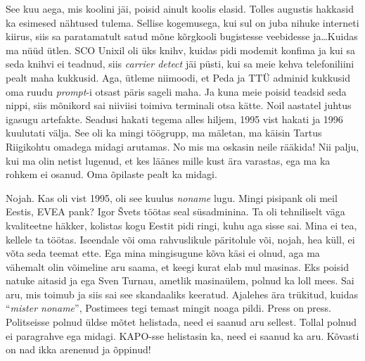 See kuu aega, mis koolini jäi, poisid ainult koolis elasid. Tolles augustis hakkasid ka esimesed nähtused tulema. Sellise kogemusega, kui sul on juba nihuke interneti kiirus,  siis sa paratamatult satud mõne kõrgkooli bugistesse veebidesse ja\ldots Kuidas ma nüüd ütlen. SCO Unixil oli üks knihv, kuidas  pidi modemit konfima ja kui sa seda knihvi ei teadnud, siis \emph{carrier detect} jäi püsti, kui sa meie kehva telefoniliini pealt maha kukkusid. Aga, ütleme niimoodi, et  Peda ja TTÜ adminid kukkusid oma ruudu \emph{prompt}-i otsast päris sageli maha. Ja kuna meie poisid teadsid seda nippi, siis mõnikord sai niiviisi toimiva terminali otsa kätte. Noil aastatel juhtus igasugu artefakte. Seadusi hakati tegema alles hiljem, 1995 vist hakati ja 1996 kuulutati välja. See oli ka mingi töögrupp, ma mäletan, ma käisin Tartus Riigikohtu omadega midagi arutamas. No mis ma oskasin neile rääkida! Nii palju, kui ma olin netist lugenud, et kes läänes mille kust ära varastas, ega ma ka rohkem ei osanud. Oma õpilaste pealt ka midagi. 


Nojah. Kas oli vist 1995, oli see kuulus \emph{noname} lugu. Mingi pisipank oli meil Eestis, EVEA pank? Igor Švets töötas seal süsadminina. Ta oli tehniliselt väga kvaliteetne häkker, kolistas kogu Eestit pidi ringi, kuhu aga sisse sai. Mina ei tea, kellele ta töötas. Iseendale või oma rahvuslikule päritolule või, nojah, hea küll, ei võta seda teemat ette. Ega mina mingisugune kõva käsi ei olnud, aga ma vähemalt olin võimeline aru saama, et keegi kurat elab mul masinas. Eks poisid natuke aitasid ja ega Sven Turnau, ametlik masinaülem, polnud ka loll mees. Sai aru, mis toimub ja siis sai see skandaaliks keeratud. Ajalehes ära trükitud, kuidas \enquote{\emph{mister noname}},  Postimees tegi temast mingit noaga pildi. Press on press. Politseisse polnud üldse mõtet helistada, need ei saanud aru sellest. Tollal polnud ei paragrahve ega midagi. KAPO-sse helistasin ka, need ei saanud ka aru. Kõvasti on nad ikka arenenud ja õppinud! 

